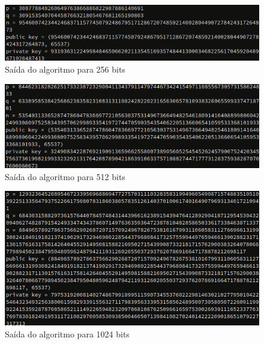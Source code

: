 \documentclass[12pt]{article}
\begin{document}
\begin{figure}[ht]
    \centering
    \includegraphics[width=\textwidth]{rsa_256.png}
    \caption{Saída do algoritmo para 256 bits}
    \label{fig:rsa_256}
\end{figure}

\begin{figure}[ht]
    \centering
    \includegraphics[width=\textwidth]{rsa_512.png}
    \caption{Saída do algoritmo para 512 bits}
    \label{fig:rsa_512}
\end{figure}

\begin{figure}[ht]
    \centering
    \includegraphics[width=\textwidth]{rsa_1024.png}
    \caption{Saída do algoritmo para 1024 bits}
    \label{fig:rsa_1024}
\end{figure}
\end{document}
